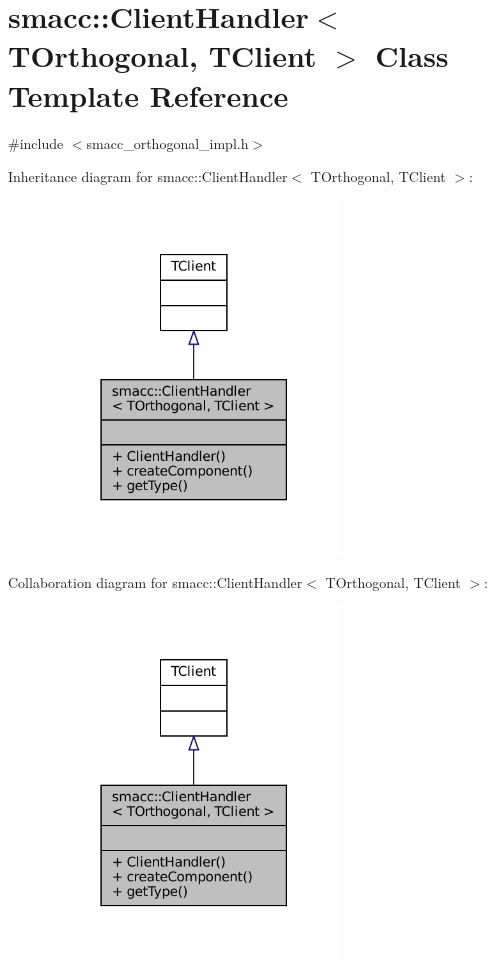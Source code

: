 \hypertarget{classsmacc_1_1ClientHandler}{}\section{smacc\+:\+:Client\+Handler$<$ T\+Orthogonal, T\+Client $>$ Class Template Reference}
\label{classsmacc_1_1ClientHandler}


{\ttfamily \#include $<$smacc\+\_\+orthogonal\+\_\+impl.\+h$>$}



Inheritance diagram for smacc\+:\+:Client\+Handler$<$ T\+Orthogonal, T\+Client $>$\+:
\nopagebreak
\begin{figure}[H]
\begin{center}
\leavevmode
\includegraphics[width=219pt]{classsmacc_1_1ClientHandler__inherit__graph}
\end{center}
\end{figure}


Collaboration diagram for smacc\+:\+:Client\+Handler$<$ T\+Orthogonal, T\+Client $>$\+:
\nopagebreak
\begin{figure}[H]
\begin{center}
\leavevmode
\includegraphics[width=219pt]{classsmacc_1_1ClientHandler__coll__graph}
\end{center}
\end{figure}
